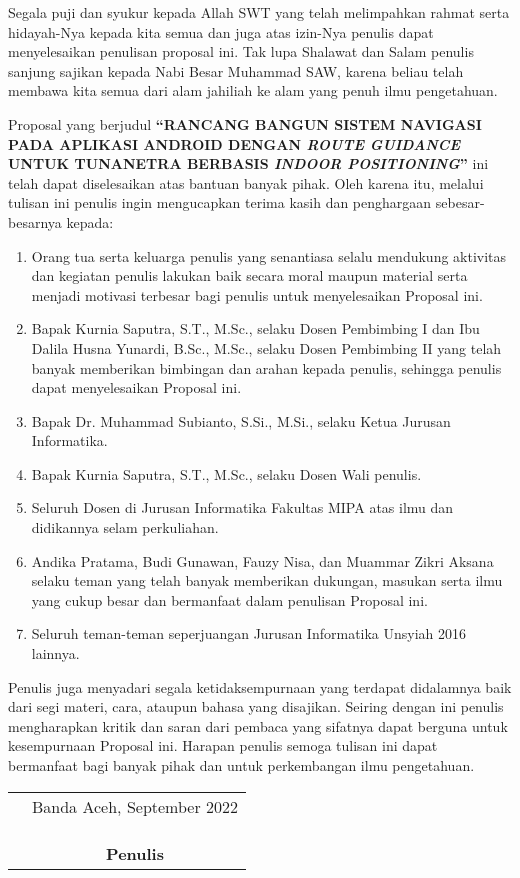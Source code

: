 \preface %


Segala puji dan syukur kepada Allah SWT yang telah melimpahkan rahmat serta hidayah-Nya kepada kita semua dan juga atas izin-Nya penulis dapat menyelesaikan penulisan proposal ini. Tak lupa Shalawat dan Salam penulis sanjung sajikan kepada Nabi Besar Muhammad SAW, karena beliau telah membawa kita semua dari alam jahiliah ke alam yang penuh ilmu pengetahuan.

Proposal yang berjudul \textbf{“RANCANG BANGUN SISTEM NAVIGASI PADA APLIKASI ANDROID DENGAN \textit{ROUTE GUIDANCE} UNTUK TUNANETRA BERBASIS \textit{INDOOR POSITIONING}”} ini telah dapat diselesaikan atas bantuan banyak pihak. Oleh karena itu, melalui tulisan ini penulis ingin mengucapkan terima kasih dan penghargaan sebesar-besarnya kepada:

\begin{enumerate}
	\item {Orang tua serta keluarga penulis yang senantiasa selalu mendukung aktivitas dan kegiatan penulis lakukan baik secara moral maupun material serta menjadi motivasi terbesar bagi penulis untuk menyelesaikan Proposal ini.}
	\item {Bapak Kurnia Saputra, S.T., M.Sc., selaku Dosen Pembimbing I dan Ibu Dalila Husna Yunardi, B.Sc., M.Sc., selaku Dosen Pembimbing II yang telah banyak memberikan bimbingan dan arahan kepada penulis, sehingga penulis dapat menyelesaikan Proposal ini.}
	\item {Bapak Dr. Muhammad Subianto, S.Si., M.Si., selaku Ketua Jurusan Informatika.}
	\item {Bapak Kurnia Saputra, S.T., M.Sc., selaku Dosen Wali penulis.}
	\item {Seluruh Dosen di Jurusan Informatika Fakultas MIPA atas ilmu dan didikannya selam perkuliahan.}
	\item {Andika Pratama, Budi Gunawan, Fauzy Nisa, dan Muammar Zikri Aksana selaku teman yang telah banyak memberikan dukungan, masukan serta ilmu yang cukup besar dan bermanfaat dalam penulisan Proposal ini. }
	\item{Seluruh teman-teman seperjuangan Jurusan Informatika Unsyiah 2016 lainnya.}
\end{enumerate}


Penulis juga menyadari segala ketidaksempurnaan yang terdapat didalamnya baik dari segi materi, cara, ataupun bahasa yang disajikan. Seiring dengan ini penulis mengharapkan kritik dan saran dari pembaca yang sifatnya dapat berguna untuk kesempurnaan Proposal ini. Harapan penulis semoga tulisan ini dapat bermanfaat bagi banyak pihak dan untuk perkembangan ilmu pengetahuan.

\vspace{1cm}


\begin{tabular}{p{7.5cm}c}
	&Banda Aceh, September 2022\\
	&\\
	&\\
	&\\
	&\textbf{Penulis}
\end{tabular}